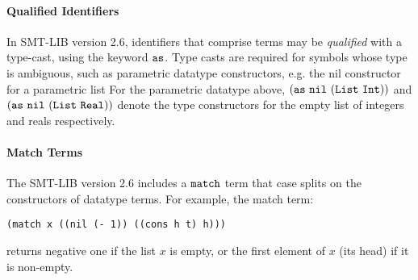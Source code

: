 \documentclass[english,a4paper,10pt]{article}
\begin{document}
\begin{appendix}
\paragraph{Qualified Identifiers}
In SMT-LIB version 2.6,
identifiers that comprise terms
may be \emph{qualified} with a type-cast, using the keyword $\texttt{as}$.
Type casts are required for symbols whose type is ambiguous,
such as parametric datatype constructors, e.g. the nil constructor
for a parametric list
For the parametric datatype above, 
${\tt (as\ nil\ (List\ Int))}$ and ${\tt (as\ nil\ (List\ Real))}$ 
denote the type constructors
for the empty list of integers and reals respectively.

\paragraph{Match Terms}
The SMT-LIB version 2.6 includes a ${\tt match}$ term
that case splits on the constructors of datatype terms.
For example,
the match term:
\begin{lstlisting}
(match x ((nil (- 1)) ((cons h t) h)))
\end{lstlisting}
returns negative one if the list $x$ is empty,
or the first element of $x$ (its head) if it is non-empty.


\end{appendix}
\end{document}
